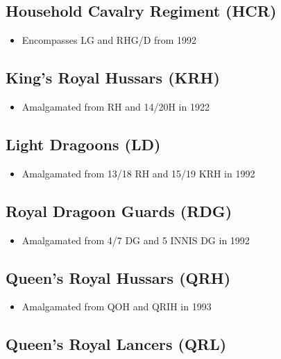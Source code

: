 \subsection*{Household Cavalry Regiment (HCR)}

\begin{itemize}
\item Encompasses LG and RHG/D from 1992
\end{itemize}

\subsection*{King's Royal Hussars (KRH)}

\begin{itemize}
\item Amalgamated from RH and 14/20H in 1922
\end{itemize}

\subsection*{Light Dragoons (LD)}

\begin{itemize}
\item Amalgamated from 13/18 RH and 15/19 KRH in 1992
\end{itemize}

\subsection*{Royal Dragoon Guards (RDG)}

\begin{itemize}
\item Amalgamated from 4/7 DG and 5 INNIS DG in 1992
\end{itemize}

\subsection*{Queen's Royal Hussars (QRH)}

\begin{itemize}
\item Amalgamated from QOH and QRIH in 1993
\end{itemize}

\subsection*{Queen's Royal Lancers (QRL)}

